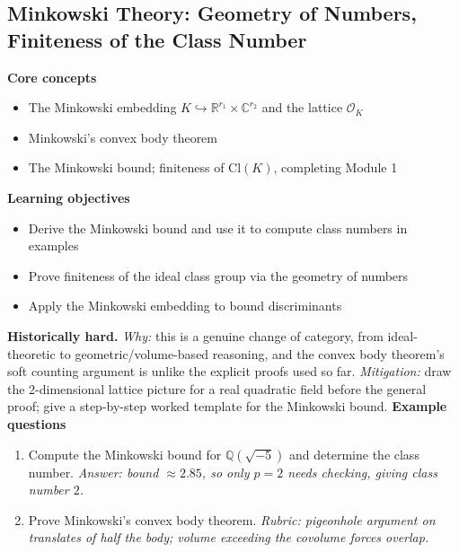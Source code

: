 \documentclass[11pt]{article}
\newcommand{\Q}{\mathbb{Q}}
\newcommand{\OK}{\mathcal{O}_K}
\begin{document}
\subsection{Minkowski Theory: Geometry of Numbers, Finiteness of the Class Number}
\textbf{Core concepts}
\begin{itemize}[noitemsep]
  \item The Minkowski embedding $K \hookrightarrow \mathbb{R}^{r_1}\times \mathbb{C}^{r_2}$ and the lattice $\OK$
  \item Minkowski's convex body theorem
  \item The Minkowski bound; finiteness of $\mathrm{Cl}(K)$, completing Module 1
\end{itemize}
\textbf{Learning objectives}
\begin{itemize}[noitemsep]
  \item Derive the Minkowski bound and use it to compute class numbers in examples
  \item Prove finiteness of the ideal class group via the geometry of numbers
  \item Apply the Minkowski embedding to bound discriminants
\end{itemize}
\textbf{Historically hard.} \emph{Why:} this is a genuine change of category, from ideal-theoretic to geometric/volume-based reasoning, and the convex body theorem's soft counting argument is unlike the explicit proofs used so far. \emph{Mitigation:} draw the 2-dimensional lattice picture for a real quadratic field before the general proof; give a step-by-step worked template for the Minkowski bound.
\textbf{Example questions}
\begin{enumerate}[noitemsep]
  \item[Q1 (foundational).] Compute the Minkowski bound for $\Q(\sqrt{-5})$ and determine the class number. \emph{Answer: bound $\approx 2.85$, so only $p=2$ needs checking, giving class number $2$.}
  \item[Q2 (advanced).] Prove Minkowski's convex body theorem. \emph{Rubric: pigeonhole argument on translates of half the body; volume exceeding the covolume forces overlap.}
\end{enumerate}

\end{document}
